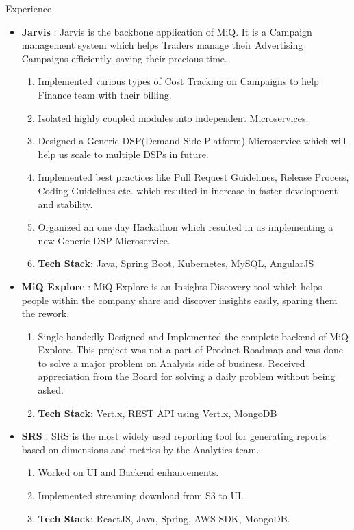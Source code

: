 \documentclass{resume} %
\begin{document}
\begin{rSection}{Experience}
\begin{itemize}
    \item {\bf{Jarvis}} : Jarvis is the backbone application of MiQ. It is a Campaign management system which helps Traders manage their Advertising Campaigns efficiently, saving their precious time. 
    \begin{enumerate}
        \item Implemented various types of Cost Tracking on Campaigns to help Finance team with their billing.
        \item Isolated highly coupled modules into independent Microservices.
        \item Designed a Generic DSP(Demand Side Platform) Microservice which will help us scale to multiple DSPs in future.
        \item Implemented best practices like Pull Request Guidelines, Release Process, Coding Guidelines etc. which resulted in increase in faster development and stability.
        \item Organized an one day Hackathon which resulted in us implementing a new Generic DSP Microservice.
        \item {\bf{Tech Stack}}: Java, Spring Boot, Kubernetes, MySQL, AngularJS
    \end{enumerate}
    \item {\bf{MiQ Explore}} : MiQ Explore is an Insights Discovery tool which helps people within the company share and discover insights easily, sparing them the rework.
    \begin{enumerate}
        \item Single handedly Designed and Implemented the complete backend of MiQ Explore. This project was not a part of Product Roadmap and was done to solve a major problem on Analysis side of business. Received appreciation from the Board for solving a daily problem without being asked.
        \item {\bf{Tech Stack}}: Vert.x, REST API using Vert.x, MongoDB
    \end{enumerate}
    \item {\bf{SRS}} : SRS is the most widely used reporting tool for generating reports based on dimensions and metrics by the Analytics team.
    \begin{enumerate}
        \item Worked on UI and Backend enhancements.
        \item Implemented streaming download from S3 to UI.
        \item {\bf{Tech Stack}}: ReactJS, Java, Spring, AWS SDK, MongoDB. 
    \end{enumerate}
\end{itemize}



\end{rSection}
\end{document}
